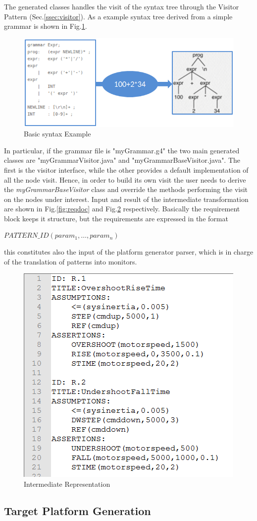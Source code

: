 The generated classes handles the visit of the syntax tree through the Visitor Pattern (Sec.\ref{ssec:visitor}). As a example syntax tree derived from a simple grammar is shown in Fig.\ref{fig:antlrtree}.

\begin{figure}[!h]
\centering
\includegraphics[width=.7\textwidth]{Figs/antlrtree.PNG}
\caption{Basic syntax Example}
\label{fig:antlrtree}
\end{figure}

In particular, if the grammar file is "myGrammar.g4" the two main generated classes are "myGrammarVisitor.java" and "myGrammarBaseVisitor.java". The first is the visitor interface, while the other provides a default implementation of all the node visit. Hence, in order to build its own visit the user needs to derive the \textit{myGrammarBaseVisitor} class and override the methods performing the visit on the nodes under interest. 
Input and result of the intermediate transformation are shown in Fig.\ref{fig:reqdoc} and Fig.\ref{fig:intermrepr} respectively. Basically the requirement block keeps it structure, but the requirements are expressed in the format
\begin{center}
$PATTERN\_ID(param_1,\dots,param_n)$
\end{center}
this constitutes also the input of the platform generator parser, which is in charge of the translation of patterns into monitors.

\begin{figure}[h]
\centering
\includegraphics[width=.6\textwidth]{Figs/intermrep.PNG}
\caption{Intermediate Representation}
\label{fig:intermrepr}
\end{figure}
\subsection{Target Platform Generation}
\label{sec:tagetgen}